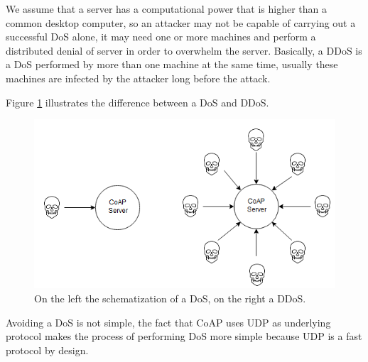 	We assume that a server has a computational power that is higher than a common desktop computer, so an attacker may not be capable of carrying out a successful DoS alone, it may need one or more machines and perform a distributed denial of server in order to overwhelm the server.\newline
	Basically, a DDoS is a DoS performed by more than one machine at the same time, usually these machines are infected by the attacker long before the attack.\newline
	
	Figure \ref{fig:coap-vuln1} illustrates the difference between a DoS and DDoS.
	
	\begin{figure}
		\includegraphics[width=\linewidth]{coap-vuln-img1.png}
		\caption{On the left the schematization of a DoS, on the right a DDoS.}
		\label{fig:coap-vuln1}
	\end{figure}

	Avoiding a DoS is not simple, the fact that CoAP uses UDP as underlying protocol makes the process of performing DoS more simple because UDP is a fast protocol by design.\newline
	
